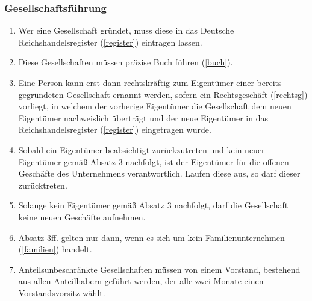 \documentclass{article}
\begin{document}
\subsubsection{Gesellschaftsführung}\label{firm}
\begin{enumerate}[(1)]
    \item Wer eine Gesellschaft gründet, muss diese in das Deutsche Reichshandelsregister (\ref{register}) eintragen lassen.
    \item Diese Gesellschaften müssen präzise Buch führen (\ref{buch}).
    \item Eine Person kann erst dann rechtskräftig zum Eigentümer einer bereits gegründeten Gesellschaft ernannt werden, sofern ein Rechtsgeschäft (\ref{rechtsg}) vorliegt, in welchem der vorherige Eigentümer die Gesellschaft dem neuen Eigentümer nachweislich überträgt und der neue Eigentümer in das Reichshandelsregister (\ref{register}) eingetragen wurde.
    \item Sobald ein Eigentümer beabsichtigt zurückzutreten und kein neuer Eigentümer gemäß Absatz 3 nachfolgt, ist der Eigentümer für die offenen Geschäfte des Unternehmens verantwortlich. Laufen diese aus, so darf dieser zurücktreten.
    \item Solange kein Eigentümer gemäß Absatz 3 nachfolgt, darf die Gesellschaft keine neuen Geschäfte aufnehmen.
    \item Absatz 3ff. gelten nur dann, wenn es sich um kein Familienunternehmen (\ref{familien}) handelt.
    \item Anteilsunbeschränkte Gesellschaften müssen von einem Vorstand, bestehend aus allen Anteilhabern geführt werden, der alle zwei Monate einen Vorstandsvorsitz wählt.

\end{enumerate}
\end{document}
